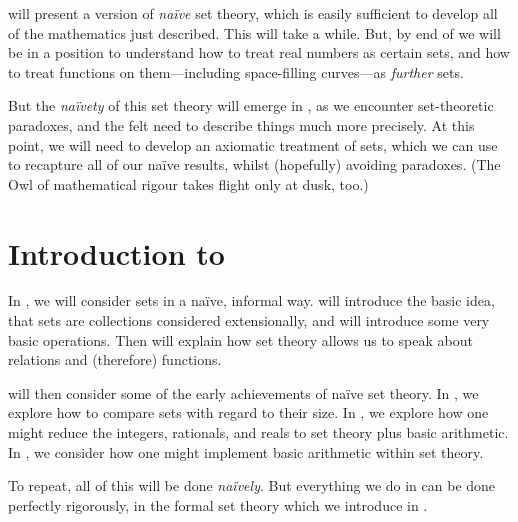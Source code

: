 will present a version of \emph{na\"ive} set
theory, which is easily sufficient to develop all of the mathematics
just described. This will take a while. But, by end of
 we will be in a position to understand how to
treat real numbers as certain sets, and how to treat functions on
them---including space-filling curves---as \emph{further} sets. 

But the \emph{na\"ivety} of this set theory will emerge in
, as we encounter set-theoretic paradoxes, and
the felt need to describe things much more precisely. At this point,
we will need to develop an axiomatic treatment of sets, which we can
use to recapture all of our na\"ive results, whilst (hopefully)
avoiding paradoxes. (The Owl of mathematical rigour takes flight only
at dusk, too.)

\OLEndChapterHook


\section*{Introduction to }

In , we will consider sets in a na\"ive, informal
way.  will introduce the basic idea, that sets
are collections considered extensionally, and will introduce some very
basic operations. Then  will
explain how set theory allows us to speak about relations and
(therefore) functions. 

 will then consider some of the
early achievements of na\"ive set theory. In
, we explore how to compare sets with regard
to their size. In , we explore how one
might reduce the integers, rationals, and reals to set theory plus
basic arithmetic. In , we consider how one
might implement basic arithmetic within set theory. 

To repeat, all of this will be done \emph{na\"ively}. But everything
we do in  can be done perfectly rigorously, in
the formal set theory which we introduce in .



